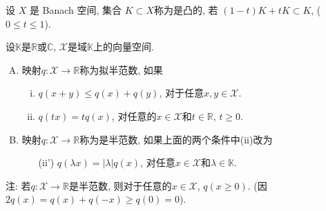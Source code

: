 设 $X$ 是 Banach 空间, 集合 $K\subset X$称为是凸的, 若 $(1-t)K+tK\subset K$, ($0\le t\le 1$).
\ed

设$\mathbb{K}$是$\mathbb{R}$或$\mathbb{C}$, $\mathcal{X}$是域$\mathbb{K}$上的向量空间.
\begin{enumerate}[A.]
 \item 映射$q: \mathcal{X}\to\mathbb{R}$称为拟半范数, 如果
 \begin{enumerate}[(i)]
  \item $q(x+y)\le q(x)+q(y)$, 对于任意$x,y\in\mathcal{X}$.
  \item $q(tx)=tq(x)$, 对任意的$x\in\mathcal{X}$和$t\in\mathbb{R}$, $t\ge0$.
 \end{enumerate}
  \item 映射$q:\mathcal{X}\to\mathbb{R}$称为是半范数, 如果上面的两个条件中(ii)改为
  \begin{itemize}
   \item[(ii')] $q(\lambda x)=|\lambda|q(x)$, 对任意$x\in\mathcal{X}$和$\lambda\in\mathbb{K}$.
  \end{itemize}
\end{enumerate}
注: 若$q:\mathcal{X}\to\mathbb{R}$是半范数, 则对于任意的$x\in\mathcal{X}$, $q(x\ge0)$. 
(因$2q(x)=q(x)+q(-x)\ge q(0)=0$).
\ed